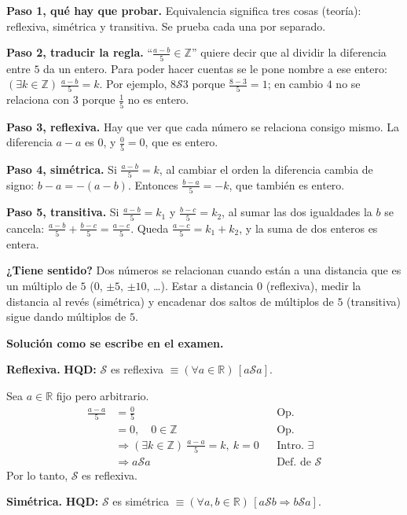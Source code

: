 \documentclass[11pt]{article}
\newcommand{\Sr}{\mathcal{S}}
\begin{document}
\begin{explica}
\textbf{Paso 1, qué hay que probar.} Equivalencia significa tres cosas (teoría): reflexiva, simétrica y transitiva. Se prueba cada una por separado.

\textbf{Paso 2, traducir la regla.} ``$\frac{a-b}{5}\in\mathbb Z$'' quiere decir que al dividir la diferencia entre $5$ da un entero. Para poder hacer cuentas se le pone nombre a ese entero: $(\exists k\in\mathbb Z)\ \frac{a-b}{5}=k$. Por ejemplo, $8\Sr3$ porque $\frac{8-3}{5}=1$; en cambio $4$ no se relaciona con $3$ porque $\frac15$ no es entero.

\textbf{Paso 3, reflexiva.} Hay que ver que cada número se relaciona consigo mismo. La diferencia $a-a$ es $0$, y $\frac05=0$, que es entero.

\textbf{Paso 4, simétrica.} Si $\frac{a-b}{5}=k$, al cambiar el orden la diferencia cambia de signo: $b-a=-(a-b)$. Entonces $\frac{b-a}{5}=-k$, que también es entero.

\textbf{Paso 5, transitiva.} Si $\frac{a-b}{5}=k_1$ y $\frac{b-c}{5}=k_2$, al sumar las dos igualdades la $b$ se cancela: $\frac{a-b}{5}+\frac{b-c}{5}=\frac{a-c}{5}$. Queda $\frac{a-c}{5}=k_1+k_2$, y la suma de dos enteros es entera.

\textbf{¿Tiene sentido?} Dos números se relacionan cuando están a una distancia que es un múltiplo de $5$ ($0$, $\pm5$, $\pm10$, \dots). Estar a distancia $0$ (reflexiva), medir la distancia al revés (simétrica) y encadenar dos saltos de múltiplos de $5$ (transitiva) sigue dando múltiplos de $5$.
\end{explica}

\textbf{Solución como se escribe en el examen.}

\textbf{Reflexiva.} \textbf{HQD:} $\Sr$ es reflexiva $\equiv(\forall a\in\mathbb R)\,[a\Sr a]$.

Sea $a\in\mathbb R$ fijo pero arbitrario.
\begin{align*}
\frac{a-a}{5}&=\frac{0}{5} && \text{Op.}\\
&=0,\quad 0\in\mathbb Z && \text{Op.}\\
&\Rightarrow (\exists k\in\mathbb Z)\ \frac{a-a}{5}=k,\ k=0 && \text{Intro. }\exists\\
&\Rightarrow a\Sr a && \text{Def. de } \Sr
\end{align*}
Por lo tanto, $\Sr$ es reflexiva.

\textbf{Simétrica.} \textbf{HQD:} $\Sr$ es simétrica $\equiv(\forall a,b\in\mathbb R)\,[a\Sr b\Rightarrow b\Sr a]$.
\end{document}

